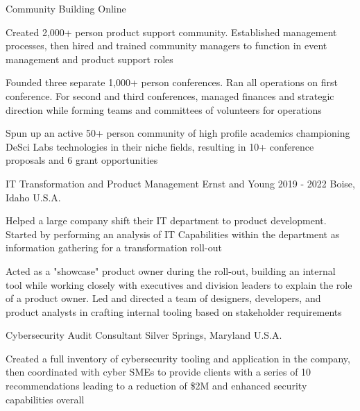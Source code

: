 \begin{cventries}
  \cventry
    {Community Building} %
    {} %
    {} %
    {Online} %
    {
      \begin{cvitems} %
        \item {Created 2,000+ person product support  community. Established management processes, then hired and trained community managers to function in event management and product support roles}
        \item {Founded three separate 1,000+ person conferences. Ran all operations on first conference. For second and third conferences, managed finances and strategic direction while forming teams and committees of volunteers for operations}
        \item {Spun up an active 50+ person community of high profile academics championing DeSci Labs technologies in their niche fields, resulting in 10+ conference proposals and 6 grant opportunities}
      \end{cvitems}
    }

  \cventry
    {IT Transformation and Product Management} %
    {Ernst and Young} %
    {2019 - 2022} %
    {Boise, Idaho U.S.A.} %
    {
      \begin{cvitems} %
        \item {Helped a large company shift their IT department to product development. Started by performing an analysis of IT Capabilities within the department as information gathering for a transformation roll-out}
        \item {Acted as a "showcase" product owner during the roll-out, building an internal tool while working closely with executives and division leaders to explain the role of a product owner. Led and directed a team of designers, developers, and product analysts in crafting internal tooling based on stakeholder requirements}
      \end{cvitems}
    }

  \cventry
    {Cybersecurity Audit Consultant} %
    {} %
    {} %
    {Silver Springs, Maryland U.S.A.} %
    {
      \begin{cvitems} %
        \item {Created a full inventory of cybersecurity tooling and application in the company, then coordinated with cyber SMEs to provide clients with a series of 10 recommendations leading to a reduction of \$2M and enhanced security capabilities overall}
      \end{cvitems}
    }


\end{cventries}
